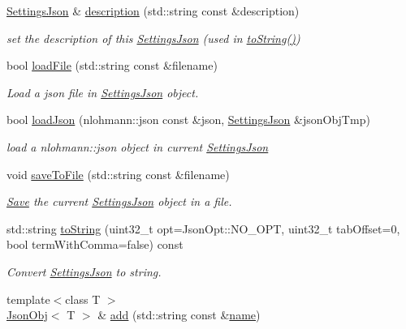 \begin{DoxyCompactItemize}
\hyperlink{class_settings_json}{Settings\+Json} \& \hyperlink{class_settings_json_aed042d48b268ef368bd1b6b0a9e013fd}{description} (std\+::string const \&description)
\begin{DoxyCompactList}\small\item\em set the description of this \hyperlink{class_settings_json}{Settings\+Json} (used in \hyperlink{class_settings_json_adf9b6991ed9896cc90455a016b5a9f29}{to\+String()}) \end{DoxyCompactList}\item 
bool \hyperlink{class_settings_json_ab57c9f2b4353baf2a7668eed3c45e05c}{load\+File} (std\+::string const \&filename)
\begin{DoxyCompactList}\small\item\em Load a json file in \hyperlink{class_settings_json}{Settings\+Json} object. \end{DoxyCompactList}\item 
bool \hyperlink{class_settings_json_aa2379955d326fae834583000cb323d1a}{load\+Json} (nlohmann\+::json const \&json, \hyperlink{class_settings_json}{Settings\+Json} \&json\+Obj\+Tmp)
\begin{DoxyCompactList}\small\item\em load a nlohmann\+::json object in current \hyperlink{class_settings_json}{Settings\+Json} \end{DoxyCompactList}\item 
void \hyperlink{class_settings_json_a5def57414c2a77c94452447d23a89f8e}{save\+To\+File} (std\+::string const \&filename)
\begin{DoxyCompactList}\small\item\em \hyperlink{class_save}{Save} the current \hyperlink{class_settings_json}{Settings\+Json} object in a file. \end{DoxyCompactList}\item 
std\+::string \hyperlink{class_settings_json_adf9b6991ed9896cc90455a016b5a9f29}{to\+String} (uint32\+\_\+t opt=Json\+Opt\+::\+N\+O\+\_\+\+O\+PT, uint32\+\_\+t tab\+Offset=0, bool term\+With\+Comma=false) const
\begin{DoxyCompactList}\small\item\em Convert \hyperlink{class_settings_json}{Settings\+Json} to string. \end{DoxyCompactList}\item 
{\footnotesize template$<$class T $>$ }\\\hyperlink{class_json_obj}{Json\+Obj}$<$ T $>$ \& \hyperlink{class_settings_json_ac889f7a07a5819175f963e1ee85da0d6}{add} (std\+::string const \&\hyperlink{class_settings_json_a301eda8c47d1140298fade3907c723d6}{name})

\end{DoxyCompactItemize}
